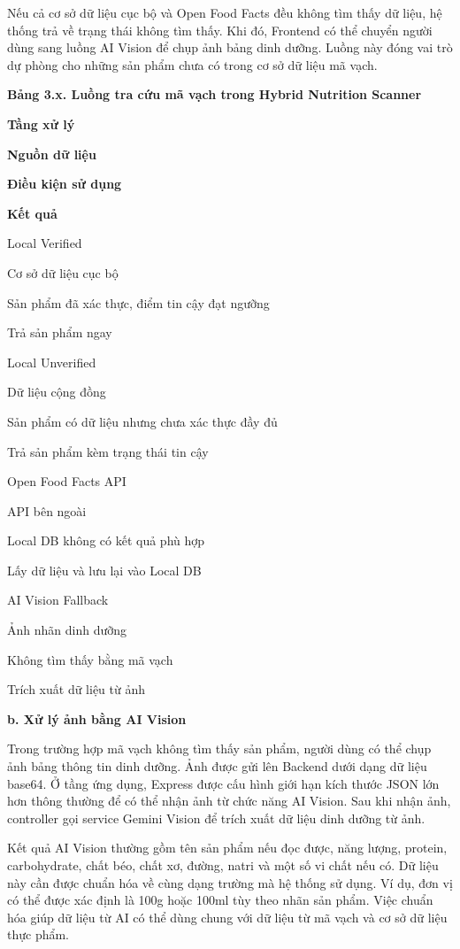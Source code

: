 \documentclass[12pt, a4paper]{report}
\begin{document}
Nếu cả cơ sở dữ liệu cục bộ và Open Food Facts đều không tìm thấy dữ liệu, hệ thống trả về trạng thái không tìm thấy. Khi đó, Frontend có thể chuyển người dùng sang luồng AI Vision để chụp ảnh bảng dinh dưỡng. Luồng này đóng vai trò dự phòng cho những sản phẩm chưa có trong cơ sở dữ liệu mã vạch.

\textbf{Bảng 3.x. Luồng tra cứu mã vạch trong Hybrid Nutrition Scanner}

\textbf{Tầng xử lý}

\textbf{Nguồn dữ liệu}

\textbf{Điều kiện sử dụng}

\textbf{Kết quả}

Local Verified

Cơ sở dữ liệu cục bộ

Sản phẩm đã xác thực, điểm tin cậy đạt ngưỡng

Trả sản phẩm ngay

Local Unverified

Dữ liệu cộng đồng

Sản phẩm có dữ liệu nhưng chưa xác thực đầy đủ

Trả sản phẩm kèm trạng thái tin cậy

Open Food Facts API

API bên ngoài

Local DB không có kết quả phù hợp

Lấy dữ liệu và lưu lại vào Local DB

AI Vision Fallback

Ảnh nhãn dinh dưỡng

Không tìm thấy bằng mã vạch

Trích xuất dữ liệu từ ảnh

\textbf{b. Xử lý ảnh bằng AI Vision}

Trong trường hợp mã vạch không tìm thấy sản phẩm, người dùng có thể chụp ảnh bảng thông tin dinh dưỡng. Ảnh được gửi lên Backend dưới dạng dữ liệu base64. Ở tầng ứng dụng, Express được cấu hình giới hạn kích thước JSON lớn hơn thông thường để có thể nhận ảnh từ chức năng AI Vision. Sau khi nhận ảnh, controller gọi service Gemini Vision để trích xuất dữ liệu dinh dưỡng từ ảnh.

Kết quả AI Vision thường gồm tên sản phẩm nếu đọc được, năng lượng, protein, carbohydrate, chất béo, chất xơ, đường, natri và một số vi chất nếu có. Dữ liệu này cần được chuẩn hóa về cùng dạng trường mà hệ thống sử dụng. Ví dụ, đơn vị có thể được xác định là 100g hoặc 100ml tùy theo nhãn sản phẩm. Việc chuẩn hóa giúp dữ liệu từ AI có thể dùng chung với dữ liệu từ mã vạch và cơ sở dữ liệu thực phẩm.
\end{document}
